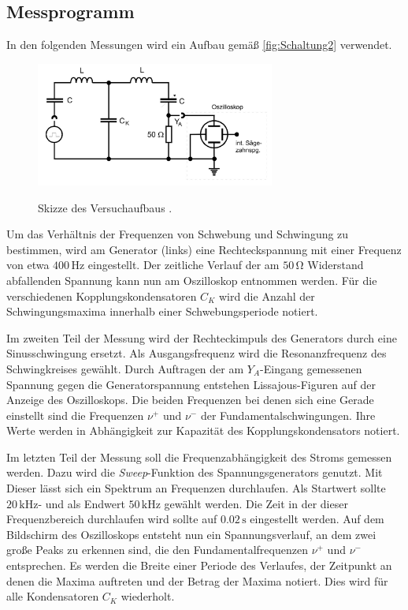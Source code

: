 \subsection{Messprogramm}
\label{subsec:Messprogramm}
In den folgenden Messungen wird ein Aufbau gemäß \autoref{fig:Schaltung2} verwendet. 
\begin{figure}
    \centering
    \includegraphics[width=0.7\textwidth]{content/Schaltung2.jpg}
    \label{fig:Schaltung1}
	\caption{Skizze des Versuchaufbaus \cite{v355}.}
\end{figure}
Um das Verhältnis der Frequenzen von Schwebung und Schwingung zu bestimmen, wird am Generator (links) eine Rechteckspannung mit einer Frequenz von etwa $400\, \unit{\hertz}$
eingestellt. Der zeitliche Verlauf der am $50 \, \unit{\ohm}$ Widerstand abfallenden Spannung kann nun am Oszilloskop entnommen werden. Für die verschiedenen 
Kopplungskondensatoren $C_K$ wird die Anzahl der Schwingungsmaxima innerhalb einer Schwebungsperiode notiert.

Im zweiten Teil der Messung wird der Rechteckimpuls des Generators durch eine Sinusschwingung ersetzt. Als Ausgangsfrequenz wird die Resonanzfrequenz des Schwingkreises
gewählt. Durch Auftragen der am $Y_A$-Eingang gemessenen Spannung gegen die Generatorspannung entstehen Lissajous-Figuren auf der Anzeige des Oszilloskops. Die beiden 
Frequenzen bei denen sich eine Gerade einstellt sind die Frequenzen $\nu^+$ und $\nu^-$ der Fundamentalschwingungen. Ihre Werte werden in Abhängigkeit zur Kapazität 
des Kopplungskondensators notiert.

Im letzten Teil der Messung soll die Frequenzabhängigkeit des Stroms gemessen werden. Dazu wird die \textit{Sweep}-Funktion des Spannungsgenerators genutzt. Mit Dieser
lässt sich ein Spektrum an Frequenzen durchlaufen. Als Startwert sollte $20 \, \unit{\kilo\hertz}$- und als Endwert $50 \, \unit{\kilo\hertz}$ gewählt werden. Die Zeit 
in der dieser Frequenzbereich durchlaufen wird sollte auf $0.02 \, \unit{\second}$ eingestellt werden. Auf dem Bildschirm des Oszilloskops entsteht nun ein Spannungsverlauf,
an dem zwei große Peaks zu erkennen sind, die den Fundamentalfrequenzen $\nu^+$ und $\nu^-$ entsprechen. Es werden die Breite einer Periode des Verlaufes, der Zeitpunkt an
denen die Maxima auftreten und der Betrag der Maxima notiert. Dies wird für alle Kondensatoren $C_K$ wiederholt.

